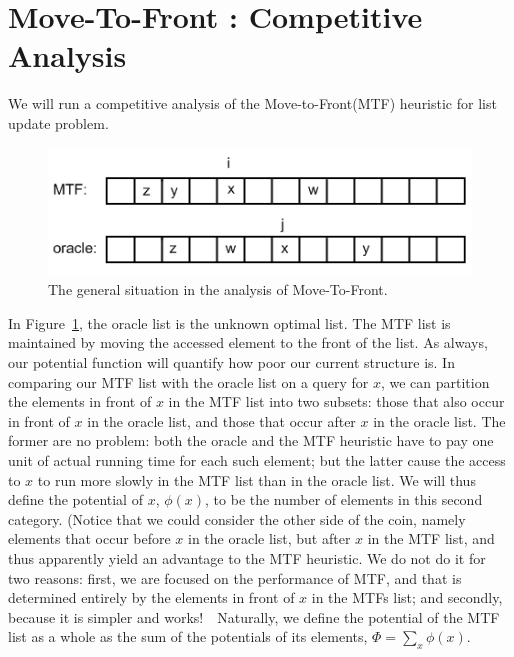 \documentclass{article}
\begin{document}
\section{Move-To-Front : Competitive Analysis}
We will run a competitive analysis of the Move-to-Front(MTF)
heuristic for list update problem.
\begin{figure}[h!]%
  \centering
    \includegraphics[scale = 0.5]{figures/figure1.png}%
  \caption{The general situation in the analysis of Move-To-Front.}%
  \label{fig:figure1}%
\end{figure}%
In Figure~\ref{fig:figure1}, the oracle list is the unknown optimal list.
The MTF list is maintained by moving the accessed element to the front of
the list.  As always, our potential function will quantify how poor our
current structure is.  In comparing our MTF list with the oracle list
on a query for $x$, we can partition the elements in front of $x$ in
the MTF list into two subsets: those that also occur in front of $x$
in the oracle list, and those that occur after $x$ in the oracle list.
The former are no problem: both the oracle and the MTF heuristic have
to pay one unit of actual running time for each such element; but the latter
cause the access to $x$ to run more slowly in the MTF list than in the
oracle list.  We will thus define the potential of $x$, $\phi(x)$, to
be the number of elements in this second category.
(Notice that we could consider the other side of the coin, namely elements
that occur before $x$ in the oracle list, but after $x$ in the MTF list,
and thus apparently yield an advantage to the MTF heuristic.  We do not
do it for two reasons: first, we are focused on the performance of MTF,
and that is determined entirely by the elements in front of $x$ in the MTFs
list; and secondly, because it is simpler and works!\ \ Naturally, we define
the potential of the MTF list as a whole as the sum of the potentials
of its elements, $\Phi=\sum_x\phi(x)$.
\end{document}
